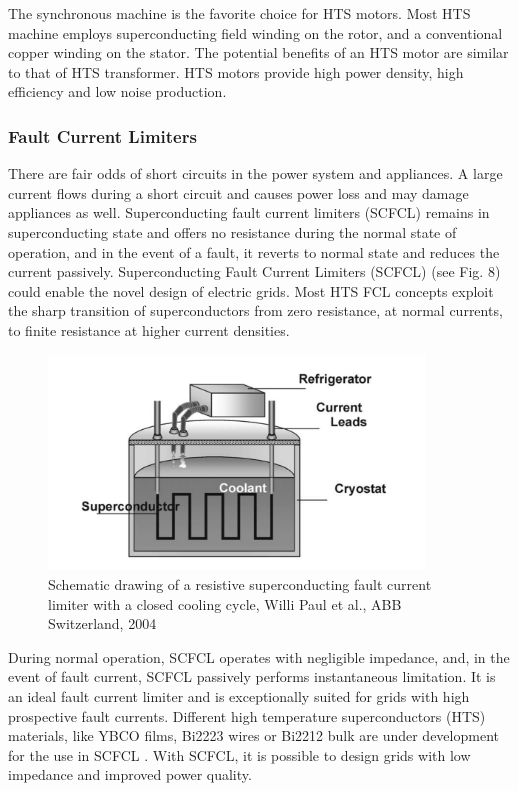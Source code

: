 \documentclass{article}
\begin{document}
	The synchronous machine is the favorite choice for HTS motors. Most HTS machine employs superconducting field winding on the rotor, and a conventional copper winding on the stator. The potential benefits of an HTS motor are similar to that of HTS transformer. HTS motors provide high power density, high efficiency and low noise production. 
	
	\subsubsection{Fault Current Limiters}
	There are fair odds of short circuits in the power system and appliances. A large current flows during a short circuit and causes power loss and may damage appliances as well. Superconducting fault current limiters (SCFCL) remains in superconducting state and offers no resistance during the normal state of operation, and in the event of a fault, it reverts to normal state and reduces the current passively. 
	Superconducting    Fault Current Limiters (SCFCL) (see Fig. 8) could enable the novel design of electric grids. Most HTS FCL concepts exploit the sharp transition of superconductors from zero resistance, at normal currents, to finite resistance at higher current densities.
	\begin{figure}[h]
		\centering
		\includegraphics[width=10cm]{SCFL.png}
		\caption{Schematic drawing of a resistive superconducting fault current limiter with a closed cooling cycle, Willi Paul et al., ABB Switzerland, 2004 }
	\end{figure} 
	
	During normal operation, SCFCL operates with negligible impedance, and, in the event of fault current,
	SCFCL passively performs instantaneous limitation. It is an ideal fault current limiter and is exceptionally suited for grids with high prospective fault currents.
	Different high temperature superconductors (HTS) materials, like YBCO films, Bi2223 wires or Bi2212 bulk are under development for the use in SCFCL \cite{Lanz2001}. With SCFCL, it is possible to design grids with low impedance and improved power quality.
	
\end{document}
